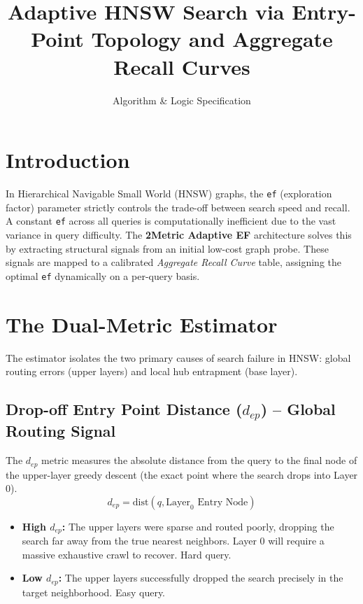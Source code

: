 \documentclass{article}
\title{\textbf{Adaptive HNSW Search via Entry-Point Topology and Aggregate Recall Curves}}
\author{Algorithm \& Logic Specification}
\date{}
\begin{document}
\maketitle

\section{Introduction}
In Hierarchical Navigable Small World (HNSW) graphs, the \texttt{ef} (exploration factor) parameter strictly controls the trade-off between search speed and recall. A constant \texttt{ef} across all queries is computationally inefficient due to the vast variance in query difficulty. The \textbf{2Metric Adaptive EF} architecture solves this by extracting structural signals from an initial low-cost graph probe. These signals are mapped to a calibrated \textit{Aggregate Recall Curve} table, assigning the optimal \texttt{ef} dynamically on a per-query basis.

\section{The Dual-Metric Estimator}
The estimator isolates the two primary causes of search failure in HNSW: global routing errors (upper layers) and local hub entrapment (base layer).

\subsection{Drop-off Entry Point Distance ($d_{ep}$) -- Global Routing Signal}
The $d_{ep}$ metric measures the absolute distance from the query to the final node of the upper-layer greedy descent (the exact point where the search drops into Layer 0).
\begin{equation}
    d_{ep} = \text{dist}(q, \text{Layer}_0 \text{ Entry Node})
\end{equation}
\begin{itemize}
    \item \textbf{High $d_{ep}$:} The upper layers were sparse and routed poorly, dropping the search far away from the true nearest neighbors. Layer 0 will require a massive exhaustive crawl to recover. Hard query.
    \item \textbf{Low $d_{ep}$:} The upper layers successfully dropped the search precisely in the target neighborhood. Easy query.
\end{itemize}
\end{document}
